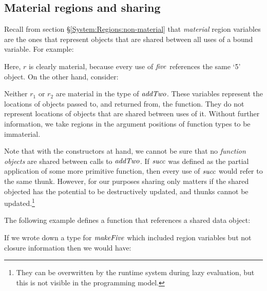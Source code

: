 \clearpage{}
\subsection{Material regions and sharing}
\label{System:Closure:shared-regions}

Recall from section \S\ref{System:Regions:non-material} that \emph{material} region variables are the ones that represent objects that are shared between all uses of a bound variable. For example:


Here, $r$ is clearly material, because every use of $\operatorname{\mathit{five}}$ references the same `5' object. On the other hand, consider:


Neither $r_1$ or $r_2$ are material in the type of $\operatorname{\mathit{addTwo}}$. These variables represent the locations of objects passed to, and returned from, the function. They do not represent locations of objects that are shared between uses of it. Without further information, we take regions in the argument positions of function types to be immaterial. 

Note that with the constructors at hand, we cannot be sure that no \emph{function objects} are shared between calls to $\operatorname{\mathit{addTwo}}$. If $\operatorname{\mathit{succ}}$ was defined as the partial application of some more primitive function, then every use of $\operatorname{\mathit{succ}}$ would refer to the same thunk. However, for our purposes sharing only matters if the shared objected has the potential to be destructively updated, and thunks cannot be updated.\footnote{They can be overwritten by the runtime system during lazy evaluation, but this is not visible in the programming model.} 

The following example defines a function that references a shared data object:


If we wrote down a type for $\operatorname{\mathit{makeFive}}$ which included region variables but not closure information then we would have:

